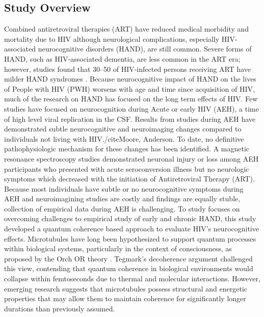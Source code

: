 \documentclass[entropy,article,submit,oneauthor,pdftex]{Definitions/mdpi}
\begin{document}
\subsection{Study Overview}
Combined antiretroviral therapies (ART) have reduced medical morbidity and mortality due to HIV although neurological complications, especially HIV-associated neurocognitive disorders (HAND), are still common. Severe forms of HAND, such as HIV-associated dementia, are less common in the ART era; however, studies found that 30–50 of HIV-infected persons receiving ART have milder HAND syndromes \cite{tozzi_persistence_2007}.  Because neurocognitive impact of HAND on the lives of People with HIV (PWH) worsens with age and time since acquisition of HIV, much of the research on HAND has focused on the long term effects of HIV.  Few studies have focused on neurocognition during Acute or early HIV (AEH), a time of high level viral replication in the CSF. Results from studies during AEH have demonstrated subtle neurocognitive and neuroimaging changes compared to individuals not living with HIV./cite{Moore, Anderson}.  To date, no definitive pathophysiologic mechanism for these changes has been identified.  A magnetic resonance spectroscopy studies demonstrated neuronal injury or loss among AEH participants who presented with acute seroconversion illness but no neurologic symptoms which decreased with the initiation of Antiretroviral Therapy (ART)\cite{for_the_charter_group_neurocognitive_2011, simmons_brain_2014}. Because most individuals have subtle or no neurocognitive symptoms during AEH and neuroimagining studies are costly and findings are equally stuble, collection of empirical data during AEH is challenging.  To study focuses on overcoming challenges to empirical study of early and chronic HAND, this study developed a quantum coherence based approach to evaluate HIV's neurocognitive effects. 
Microtubules have long been hypothesized to support quantum processes within biological systems, particularly in the context of consciousness, as proposed by the Orch OR theory \cite{hameroff_orchestrated_1996,nanopoulos_quantum_1995}. Tegmark's decoherence argument \cite{tegmark_importance_2000} challenged this view, contending that quantum coherence in biological environments would collapse within femtoseconds due to thermal and molecular interactions. However, emerging research suggests that microtubules possess structural and energetic properties that may allow them to maintain coherence for significantly longer durations than previously assumed.
\end{document}

